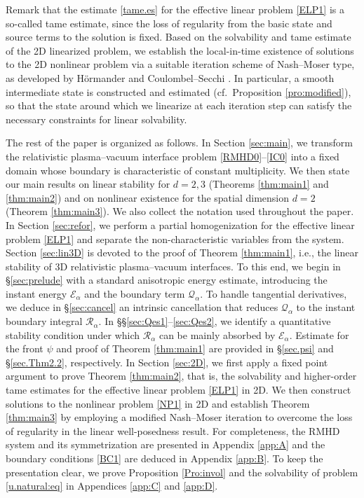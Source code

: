 \documentclass[twoside,11pt]{article}
\numberwithin{equation}{section}
\begin{document}
Remark that the estimate \eqref{tame.es} for the effective linear problem \eqref{ELP1} is a so-called tame estimate, since the loss of regularity from the basic state and source terms to the solution is fixed.
Based on the solvability and tame estimate of the 2D linearized problem, we establish the local-in-time existence of solutions to the 2D nonlinear problem via a suitable iteration scheme of Nash--Moser type, as developed by {\sc H\"{o}rmander} \cite{H76MR0602181} and {\sc Coulombel--Secchi} \cite{CS08MR2423311}.
In particular, a smooth intermediate state is constructed and estimated (cf.~Proposition \ref{pro:modified}), so that the state around which we linearize at each iteration step can satisfy the necessary constraints for linear solvability.



The rest of the paper is organized as follows.
In Section \ref{sec:main}, we transform the relativistic plasma--vacuum interface problem \eqref{RMHD0}--\eqref{IC0} into a fixed domain whose boundary is characteristic of constant multiplicity.
We then state our main results on linear stability for $d=2,3$ (Theorems \ref{thm:main1} and \ref{thm:main2}) and on nonlinear existence for the spatial dimension $d=2$ (Theorem \ref{thm:main3}).
We also collect the notation used throughout the paper.
In Section \ref{sec:refor}, we perform a partial homogenization for the effective linear problem \eqref{ELP1} and separate the non-characteristic variables from the system.
Section \ref{sec:lin3D} is devoted to the proof of Theorem \ref{thm:main1}, i.e., the linear stability of 3D relativistic plasma--vacuum interfaces.
To this end, we begin in \S\ref{sec:prelude} with a standard anisotropic energy estimate, introducing the instant energy $\mathcal{E}_{\alpha}$ and the boundary term $\mathcal{Q}_{\alpha}$.
To handle tangential derivatives, we deduce in \S\ref{sec:cancel} an intrinsic cancellation that reduces $\mathcal{Q}_{\alpha}$ to the instant boundary integral $\mathcal{R}_{\alpha}$.
In \S\S \ref{sec:Qes1}--\ref{sec:Qes2}, we identify a quantitative stability condition under which $\mathcal{R}_{\alpha}$ can be mainly absorbed by $\mathcal{E}_{\alpha}$.
Estimate for the front $\psi$ and proof of Theorem \ref{thm:main1} are provided in \S \ref{sec.psi} and \S \ref{sec.Thm2.2}, respectively.
In Section \ref{sec:2D}, we first apply a fixed point argument to prove Theorem \ref{thm:main2}, that is, the solvability and higher-order tame estimates for the effective linear problem \eqref{ELP1} in 2D.
We then construct solutions to the nonlinear problem \eqref{NP1} in 2D and establish Theorem \ref{thm:main3} by employing a modified Nash--Moser iteration to overcome the loss of regularity in the linear well-posedness result.
For completeness, the RMHD system and its symmetrization are presented in Appendix \ref{app:A} and the boundary conditions \eqref{BC1} are deduced in Appendix \ref{app:B}.
To keep the presentation clear, we prove Proposition \ref{Pro:invol} and the solvability of problem \eqref{u.natural:eq} in Appendices \ref{app:C} and \ref{app:D}.
\end{document}
